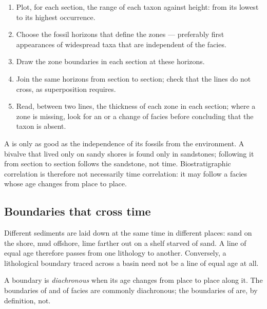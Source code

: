 \begin{method}\label{met:b1:stratigraphic-scale:biozones}
\begin{enumerate}
  \item Plot, for each section, the range of each taxon against height: from
        its lowest to its highest occurrence.
  \item Choose the fossil horizons that define the zones --- preferably first
        appearances of widespread taxa that are independent of the facies.
  \item Draw the zone boundaries in each section at these horizons.
  \item Join the same horizons from section to section; check that the lines
        do not cross, as superposition requires.
  \item Read, between two lines, the thickness of each zone in each section;
        where a zone is missing, look for an  or a change of
        facies before concluding that the taxon is absent.
\end{enumerate}
\end{method}

A  is only as good as the independence of its fossils from the
environment. A bivalve that lived only on sandy shores is found only in
sandstones; following it from section to section follows the sandstone, not
time. Biostratigraphic correlation is therefore not necessarily time
correlation: it may follow a facies whose age changes from place to place.

\subsection*{Boundaries that cross time}

Different sediments are laid down at the same time in different places: sand on
the shore, mud offshore, lime farther out on a shelf starved of sand. A line of
equal age therefore passes from one lithology to another. Conversely, a
lithological boundary traced across a basin need not be a line of equal age at
all.

\begin{definition}\label{def:b1:stratigraphic-scale:diachronous}
A boundary is \emph{diachronous} when its age
changes from place to place along it. The boundaries of  and of
facies are commonly diachronous; the boundaries of 
are, by definition, not.
\end{definition}

